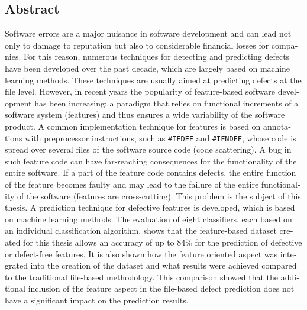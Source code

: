 \begin{otherlanguage}{english}
    \section*{Abstract}
    
Software errors are a major nuisance in software development and can lead not only to damage to reputation but also to considerable financial losses for companies. For this reason, numerous techniques for detecting and predicting defects have been developed over the past decade, which are largely based on machine learning methods. These techniques are usually aimed at predicting defects at the file level. However, in recent years the popularity of feature-based software development has been increasing: a paradigm that relies on functional increments of a software system (features) and thus ensures a wide variability of the software product. A common implementation technique for features is based on annotations with preprocessor instructions, such as \texttt{\#IFDEF} and \texttt{\#IFNDEF}, whose code is spread over several files of the software source code (\glqq code scattering\grqq). A bug in such feature code can have far-reaching consequences for the functionality of the entire software. If a part of the feature code contains defects, the entire function of the feature becomes faulty and may lead to the failure of the entire functionality of the software (features are \glqq cross-cutting\grqq). This problem is the subject of this thesis. A prediction technique for defective features is developed, which is based on machine learning methods. The evaluation of eight classifiers, each based on an individual classification algorithm, shows that the feature-based dataset created for this thesis allows an accuracy of up to 84\% for the prediction of defective or defect-free features. It is also shown how the feature oriented aspect was integrated into the creation of the dataset and what results were achieved compared to the traditional file-based methodology. This comparison showed that the additional inclusion of the feature aspect in the file-based defect prediction does not have a significant impact on the prediction results.

\end{otherlanguage}
\cleardoublepage
